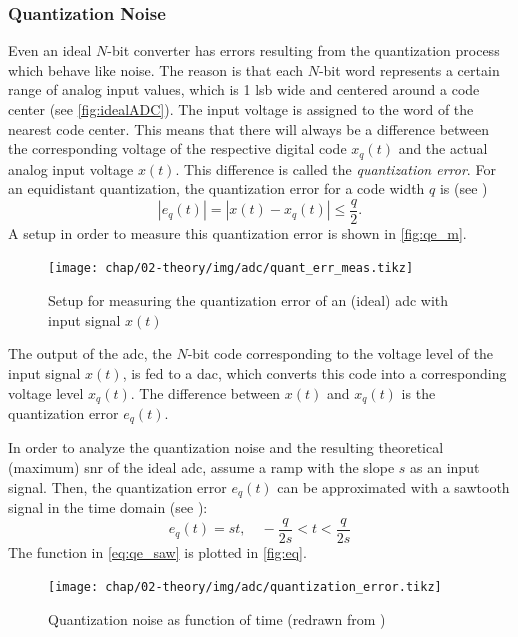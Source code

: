 \subsubsection{Quantization Noise}\label{par:quant_noise}
Even an ideal $N$-bit converter has errors resulting from the quantization process which behave like noise. %
The reason is that each $N$-bit word represents a certain range of analog input values, which is 1 \gls{lsb} wide and centered around a code center (see \autoref{fig:idealADC}). \cite{Lundberg}
The input voltage is assigned to the word of the nearest code center.
This means that there will always be a difference between the corresponding voltage of the respective digital code $x_q(t)$ and the actual analog input voltage $x(t)$.
This difference is called the \textit{quantization error}. For an equidistant quantization, the quantization error for a code width $q$ is (see \cite{puente2015})
\begin{equation}
	\left| e_q(t) \right| = \left| x(t) - x_q(t) \right| \leq \frac{q}{2}.
\end{equation}
A setup in order to measure this quantization error is shown in \autoref{fig:qe_m}. 
\begin{figure}[tb]
	\centering
	\texttt{[image: chap/02-theory/img/adc/quant\_err\_meas.tikz]}
	\caption[Measurement setup for quantization error]{Setup for measuring the quantization error of an (ideal) \gls{adc} with input signal $x(t)$}
	\label{fig:qe_m}
\end{figure}

The output of the \gls{adc}, the $N$-bit code corresponding to the voltage level of the input signal $x(t)$, is fed to a \gls{dac}, which converts this code into a corresponding voltage level $x_q(t)$. 
The difference between $x(t)$ and $x_q(t)$ is the quantization error $e_q(t)$.

In order to analyze the quantization noise and the resulting theoretical (maximum) \gls{snr} of the ideal \gls{adc}, assume a ramp with the slope $s$ as an input signal. 
Then, the quantization error $e_q(t)$ can be approximated with a sawtooth signal in the time domain (see \cite{walt}): 
\begin{equation}\label{eq:qe_saw}
	e_q(t) = st, \quad -\frac{q}{2s} < t < \frac{q}{2s} 
\end{equation}
The function in \autoref{eq:qe_saw} is plotted in \autoref{fig:eq}.
\begin{figure}[tb]
	\centering
	\texttt{[image: chap/02-theory/img/adc/quantization\_error.tikz]}
	\caption{Quantization noise as function of time (redrawn from \cite{walt})}
	\label{fig:eq}
\end{figure}

